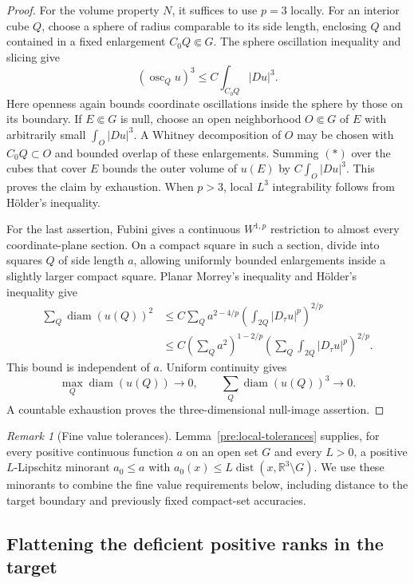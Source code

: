 \documentclass[11pt]{article}
\numberwithin{equation}{section}
\theoremstyle{definition}
\theoremstyle{remark}
\newtheorem{remark}[theorem]{Remark}
\begin{document}
\begin{proof}
For the volume property $N$, it suffices to use $p=3$ locally.
For an interior cube $Q$, choose a sphere of radius comparable to
its side length, enclosing $Q$ and contained in a fixed enlargement
$C_0Q\Subset G$.  The sphere oscillation inequality and slicing give
\[
 (\operatorname{osc}_Q u)^3
 \le C\int_{C_0Q}|Du|^3.                 \tag{$*$}
\]
Here openness again bounds coordinate oscillations inside the sphere
by those on its boundary.  If $E\Subset G$ is null, choose an open
neighborhood $O\Subset G$ of $E$ with arbitrarily small
$\int_O|Du|^3$.  A Whitney decomposition of $O$ may be chosen with
$C_0Q\subset O$ and bounded overlap of these enlargements.  Summing
$(*)$ over the cubes that cover $E$ bounds the outer volume of $u(E)$
by $C\int_O|Du|^3$.  This proves the claim by exhaustion.  When
$p>3$, local $L^3$ integrability follows from H\"older's inequality.

For the last assertion, Fubini gives a continuous $W^{1,p}$
restriction to almost every coordinate-plane section.  On a compact
square in such a section, divide into squares $Q$ of side length
$a$, allowing uniformly bounded enlargements inside a slightly larger
compact square.  Planar Morrey's inequality and H\"older's inequality
give
\[
 \begin{split}
 \sum_Q\operatorname{diam}(u(Q))^2
 &\le C\sum_Q
 a^{2-4/p}\left(\int_{2Q}|D_\tau u|^p\right)^{2/p}\\
 &\le C\left(\sum_Q a^2\right)^{1-2/p}
       \left(\sum_Q\int_{2Q}|D_\tau u|^p\right)^{2/p}.
 \end{split}
\]
This bound is independent of $a$.  Uniform continuity gives
\[
 \max_Q\operatorname{diam}(u(Q))\longrightarrow0,
 \qquad \sum_Q\operatorname{diam}(u(Q))^3\longrightarrow0.
\]
A countable exhaustion proves the three-dimensional null-image
assertion.
\end{proof}

\begin{remark}[Fine value tolerances]\label{hp:fine-tolerance}
Lemma~\ref{pre:local-tolerances} supplies, for every positive continuous
function $a$ on an open set $G$ and every $L>0$, a positive
$L$-Lipschitz minorant $a_0\le a$ with
$a_0(x)\le L\operatorname{dist}(x,\mathbb R^3\setminus G)$.  We use these minorants to
combine the fine value requirements below, including distance to the
target boundary and previously fixed compact-set accuracies.
\end{remark}


\subsection{Flattening the deficient positive ranks in the target}
\end{document}

